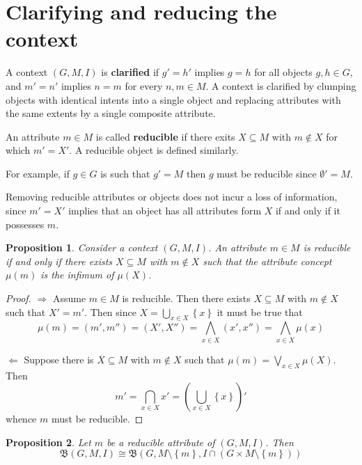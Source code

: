 \documentclass[a4paper]{article}
\newcommand{\obj}[1]{{\left\{ #1 \right \}}}
\newcommand{\brac}[1]{{\left ( #1 \right )}}
\newcommand{\cltc}{\mathfrak{B}}
\newtheorem{prop}{Proposition}
\begin{document}



\section{Clarifying and reducing the context} %
\label{sec:clarifying_and_reducing_the_context}

A context $(G,M,I)$ is \textbf{clarified} if $g'=h'$ implies $g=h$ for all objects $g,h\in G$, and $m'=n'$ implies $n=m$ for every $n,m\in M$. A context is clarified by clumping objects with identical intents into a single object and replacing attributes with the same extents by a single composite attribute.

An attribute $m\in M$ is called \textbf{reducible} if there exits $X\subseteq M$ with $m\notin X$ for which $m' = X'$. A reducible object is defined similarly.

For example, if $g\in G$ is such that $g'=M$ then $g$ must be reducible since $\emptyset'=M$.

Removing reducible attributes or objects does not incur a loss of information, since $m'=X'$ implies that an object has all attributes form $X$ if and only if it possesses $m$.

\begin{prop} Consider a context $(G,M,I)$. An attribute $m\in M$ is reducible if and only if there exists $X\subseteq M$ with $m\notin X$ such that the attribute concept $\mu(m)$ is the infimum of $\mu(X)$.
\end{prop}

\begin{proof}
$\Rightarrow$ Assume $m\in M$ is reducible. Then there exists $X\subseteq M$ with $m\notin X$ such that $X'=m'$. Then since $X = \bigcup_{x\in X} \obj{x}$ it must be true that
\[\mu(m) = (m', m'') = (X',X'') = \bigwedge_{x\in X} (x',x'') = \bigwedge_{x\in X} \mu(x)\]

$\Leftarrow$ Suppose there is $X\subseteq M$ with $m\notin X$ such that $\mu(m)=\bigvee_{x\in X} \mu(X)$. Then \[m' = \bigcap_{x\in X} x' = \brac{\bigcup_{x\in X} \obj{x}}'\] whence $m$ must be reducible.
\end{proof}

\begin{prop} Let $m$ be a reducible attribute of $(G,M,I)$. Then \[
\cltc(G,M,I) \cong \cltc\brac{G,M\setminus \obj{m},I\cap ( G\times M\setminus \obj{m})}\]
\end{prop}
\end{document}
